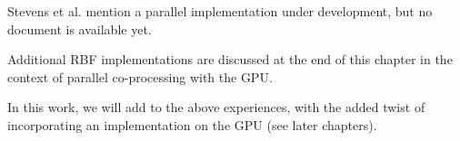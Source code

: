\documentclass{report}
\begin{document}
{Stevens et al. \cite{Stevens2009a} mention a parallel implementation under development, but no document is available yet. 

Additional RBF implementations are discussed at the end of this chapter in the context of parallel co-processing with the GPU. 

In this work, we will add to the above experiences, with the added twist of incorporating an implementation on the GPU (see later chapters). 

%



}
\end{document}
